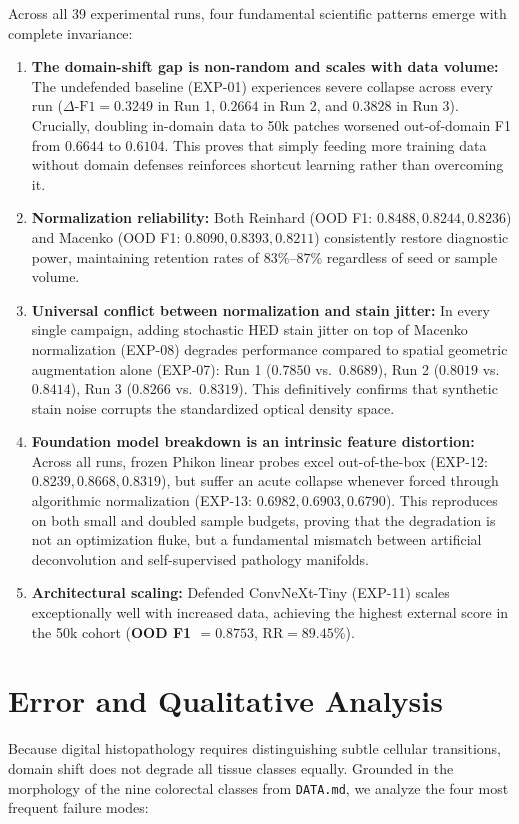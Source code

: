 \documentclass[11pt,a4paper]{article}
\begin{document}
Across all 39 experimental runs, four fundamental scientific patterns emerge with complete invariance:
\begin{enumerate}[leftmargin=*,itemsep=1pt]
  \item \textbf{The domain-shift gap is non-random and scales with data volume:} The undefended baseline (EXP-01) experiences severe collapse across every run ($\Delta\text{-F1} = 0.3249$ in Run 1, $0.2664$ in Run 2, and $0.3828$ in Run 3). Crucially, doubling in-domain data to 50k patches worsened out-of-domain F1 from $0.6644$ to $0.6104$. This proves that simply feeding more training data without domain defenses reinforces shortcut learning rather than overcoming it.
  \item \textbf{Normalization reliability:} Both Reinhard (OOD F1: $0.8488, 0.8244, 0.8236$) and Macenko (OOD F1: $0.8090, 0.8393, 0.8211$) consistently restore diagnostic power, maintaining retention rates of $83\%$--$87\%$ regardless of seed or sample volume.
  \item \textbf{Universal conflict between normalization and stain jitter:} In every single campaign, adding stochastic HED stain jitter on top of Macenko normalization (EXP-08) degrades performance compared to spatial geometric augmentation alone (EXP-07): Run 1 ($0.7850$ vs.\ $0.8689$), Run 2 ($0.8019$ vs.\ $0.8414$), Run 3 ($0.8266$ vs.\ $0.8319$). This definitively confirms that synthetic stain noise corrupts the standardized optical density space.
  \item \textbf{Foundation model breakdown is an intrinsic feature distortion:} Across all runs, frozen Phikon linear probes excel out-of-the-box (EXP-12: $0.8239, 0.8668, 0.8319$), but suffer an acute collapse whenever forced through algorithmic normalization (EXP-13: $0.6982, 0.6903, 0.6790$). This reproduces on both small and doubled sample budgets, proving that the degradation is not an optimization fluke, but a fundamental mismatch between artificial deconvolution and self-supervised pathology manifolds.
  \item \textbf{Architectural scaling:} Defended ConvNeXt-Tiny (EXP-11) scales exceptionally well with increased data, achieving the highest external score in the 50k cohort (\textbf{OOD F1 $= 0.8753$}, $\text{RR} = 89.45\%$).
\end{enumerate}

\section{Error and Qualitative Analysis}
Because digital histopathology requires distinguishing subtle cellular transitions, domain shift does not degrade all tissue classes equally. Grounded in the morphology of the nine colorectal classes from \texttt{DATA.md}, we analyze the four most frequent failure modes:
\end{document}
